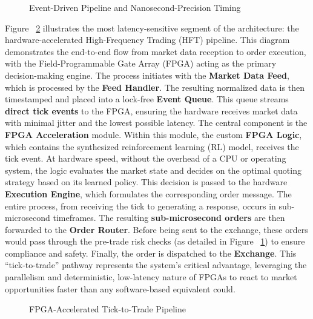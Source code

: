 \begin{figure}
    \centering
    
    \caption{Event-Driven Pipeline and Nanosecond-Precision Timing} 
    \label{fig:event_pipeline_timing}
\end{figure}

Figure ~\ref{fig:tick_to_trade_pipeline} illustrates the most latency-sensitive segment of the architecture: the hardware-accelerated High-Frequency Trading (HFT) pipeline. This diagram demonstrates the end-to-end flow from market data reception to order execution, with the Field-Programmable Gate Array (FPGA) acting as the primary decision-making engine. The process initiates with the \textbf{Market Data Feed}, which is processed by the \textbf{Feed Handler}. The resulting normalized data is then timestamped and placed into a lock-free \textbf{Event Queue}. This queue streams \textbf{direct tick events} to the FPGA, ensuring the hardware receives market data with minimal jitter and the lowest possible latency. The central component is the \textbf{FPGA Acceleration} module. Within this module, the custom \textbf{FPGA Logic}, which contains the synthesized reinforcement learning (RL) model, receives the tick event. At hardware speed, without the overhead of a CPU or operating system, the logic evaluates the market state and decides on the optimal quoting strategy based on its learned policy. This decision is passed to the hardware \textbf{Execution Engine}, which formulates the corresponding order message. The entire process, from receiving the tick to generating a response, occurs in sub-microsecond timeframes. The resulting \textbf{sub-microsecond orders} are then forwarded to the \textbf{Order Router}. Before being sent to the exchange, these orders would pass through the pre-trade risk checks (as detailed in Figure ~\ref{fig:event_pipeline_timing}) to ensure compliance and safety. Finally, the order is dispatched to the \textbf{Exchange}. This ``tick-to-trade'' pathway represents the system's critical advantage, leveraging the parallelism and deterministic, low-latency nature of FPGAs to react to market opportunities faster than any software-based equivalent could. 

\begin{figure}
    \centering
    
    \caption{FPGA-Accelerated Tick-to-Trade Pipeline}
    \label{fig:tick_to_trade_pipeline}
\end{figure}

